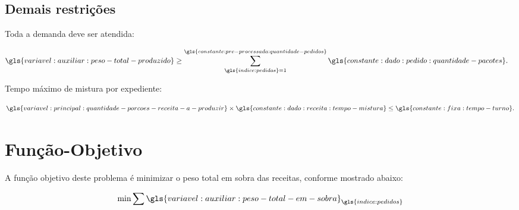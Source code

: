 \subsection{Demais restrições}

Toda a demanda deve ser atendida:

\begin{align}
    \gls{variavel:auxiliar:peso-total-produzido} &
    \geq \sum_{\gls{indice:pedidos} = 1}
    ^{\gls{constante:pre-processada:quantidade-pedidos}} \gls
    {constante:dado:pedido:quantidade-pacotes}.
\end{align}

Tempo máximo de mistura por expediente:

\begin{align}
    \gls{variavel:principal:quantidade-porcoes-receita-a-produzir}
    \times \gls{constante:dado:receita:tempo-mistura}
    \leq \gls{constante:fixa:tempo-turno}.
\end{align}

\section{Função-Objetivo}

A função objetivo deste problema é minimizar o peso total em sobra das receitas, conforme mostrado abaixo:

\begin{align}
    \min \sum \gls{variavel:auxiliar:peso-total-em-sobra}_{\gls{indice:pedidos}}
\end{align}
